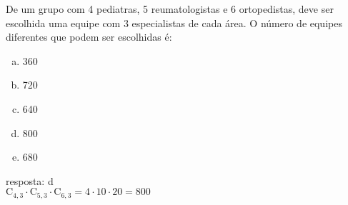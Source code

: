 \begin{ex}
De um grupo com 4 pediatras, 5 reumatologistas e 6 ortopedistas, deve ser escolhida uma equipe com 3 especialistas de cada área. O número de equipes diferentes que podem ser escolhidas é:
   \begin{enumerate}[(a)]
   \item 360
   \item 720
   \item 640
   \item 800
   \item 680
   \end{enumerate}
     \begin{sol}
     resposta: d \\
     $\mathrm{C}_{4,3}\cdot\mathrm{C}_{5,3}\cdot\mathrm{C}_{6,3}= 4\cdot10\cdot20=800$
     \end{sol}
\end{ex}